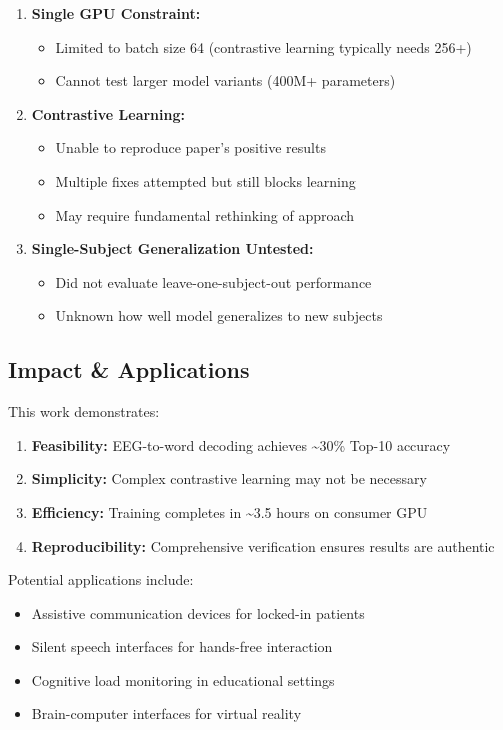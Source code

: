 \documentclass[12pt,a4paper]{article}
\begin{document}
\begin{enumerate}
    \item \textbf{Single GPU Constraint:}
    \begin{itemize}
        \item Limited to batch size 64 (contrastive learning typically needs 256+)
        \item Cannot test larger model variants (400M+ parameters)
    \end{itemize}
    
    \item \textbf{Contrastive Learning:}
    \begin{itemize}
        \item Unable to reproduce paper's positive results
        \item Multiple fixes attempted but still blocks learning
        \item May require fundamental rethinking of approach
    \end{itemize}
    
    \item \textbf{Single-Subject Generalization Untested:}
    \begin{itemize}
        \item Did not evaluate leave-one-subject-out performance
        \item Unknown how well model generalizes to new subjects
    \end{itemize}
\end{enumerate}

\subsection{Impact \& Applications}

This work demonstrates:
\begin{enumerate}
    \item \textbf{Feasibility:} EEG-to-word decoding achieves \textasciitilde30\% Top-10 accuracy
    \item \textbf{Simplicity:} Complex contrastive learning may not be necessary
    \item \textbf{Efficiency:} Training completes in \textasciitilde3.5 hours on consumer GPU
    \item \textbf{Reproducibility:} Comprehensive verification ensures results are authentic
\end{enumerate}

Potential applications include:
\begin{itemize}
    \item Assistive communication devices for locked-in patients
    \item Silent speech interfaces for hands-free interaction
    \item Cognitive load monitoring in educational settings
    \item Brain-computer interfaces for virtual reality
\end{itemize}
\end{document}
